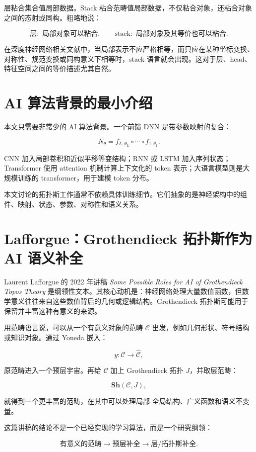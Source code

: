 \documentclass[UTF8,11pt,fontset=none]{ctexart}
\begin{document}
层粘合集合值局部数据。Stack 粘合范畴值局部数据，不仅粘合对象，还粘合对象之间的态射或同构。粗略地说：


\[
\text{层}:\text{ 局部对象可以粘合},
\qquad
\text{stack}:\text{ 局部对象及其等价也可以粘合}.
\]

在深度神经网络相关文献中，当局部表示不应严格相等，而只应在某种坐标变换、对称性、规范变换或同构意义下相等时，stack 语言就会出现。这对于层、head、特征空间之间的等价描述尤其自然。


\section{AI 算法背景的最小介绍}

本文只需要非常少的 AI 算法背景。一个前馈 DNN 是带参数映射的复合：


\[
N_\theta=f_{L,\theta_L}\circ\cdots\circ f_{1,\theta_1}.
\]

CNN 加入局部卷积和近似平移等变结构；RNN 或 LSTM 加入序列状态；Transformer 使用 attention 机制计算上下文化的 token 表示；大语言模型则是大规模训练的 transformer，用于建模 token 分布。


本文讨论的拓扑斯工作通常不依赖具体训练细节。它们抽象的是神经架构中的组件、映射、状态、参数、对称性和语义关系。


\section{Lafforgue：Grothendieck 拓扑斯作为 AI 语义补全}

Laurent Lafforgue 的 2022 年讲稿 \emph{Some Possible Roles for AI of Grothendieck Topos Theory} 是纲领性文本。其核心动机是：神经网络处理大量数值函数，但数学意义往往来自这些数值背后的几何或逻辑结构。Grothendieck 拓扑斯可能用于保留并丰富这种有意义的来源。


用范畴语言说，可以从一个有意义对象的范畴 \(\mathcal{C}\) 出发，例如几何形状、符号结构或知识对象。通过 Yoneda 嵌入：


\[
y:\mathcal{C}\to\widehat{\mathcal{C}},
\]

原范畴进入一个预层宇宙。再给 \(\mathcal{C}\) 加上 Grothendieck 拓扑 \(J\)，并取层范畴：


\[
\mathbf{Sh}(\mathcal{C},J),
\]

就得到一个更丰富的范畴，在其中可以处理局部-全局结构、广义函数和语义不变量。


这篇讲稿的结论不是一个已经实现的学习算法，而是一个研究纲领：


\[
\text{有意义的范畴}
\longrightarrow
\text{预层补全}
\longrightarrow
\text{层/拓扑斯补全}.
\]
\end{document}
